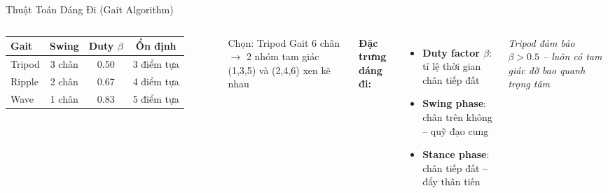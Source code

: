 \begin{frame}{Thuật Toán Dáng Đi (Gait Algorithm)}
  \begin{columns}[T]
      \centering
      \begin{tabular}{lccc}
        \toprule
        \textbf{Gait} & \textbf{Swing} & \textbf{Duty $\beta$} & \textbf{Ổn định} \\
        \midrule
        Tripod & 3 chân & 0.50 & 3 điểm tựa \\
        Ripple & 2 chân & 0.67 & 4 điểm tựa \\
        Wave   & 1 chân & 0.83 & 5 điểm tựa \\
        \bottomrule
      \end{tabular}
      \vspace{0.3cm}

      \begin{block}{Chọn: Tripod Gait}
        6 chân $\to$ 2 nhóm tam giác (1,3,5) và (2,4,6) xen kẽ nhau
      \end{block}
      \textbf{Đặc trưng dáng đi:}
      \begin{itemize}
        \item \textbf{Duty factor $\beta$}: tỉ lệ thời gian chân tiếp đất
        \item \textbf{Swing phase}: chân trên không -- quỹ đạo cung
        \item \textbf{Stance phase}: chân tiếp đất -- đẩy thân tiến
      \end{itemize}
      \vspace{0.2cm}
      \textit{Tripod đảm bảo $\beta > 0.5$ -- luôn có tam giác đỡ bao quanh trọng tâm}
  \end{columns}
\end{frame}

